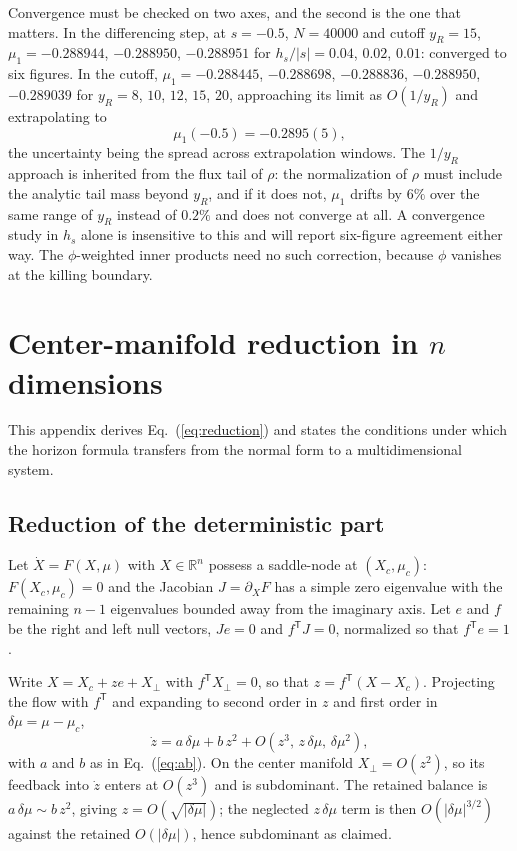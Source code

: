 Convergence must be checked on two axes, and the second is the one that matters.  In the differencing step, at $s=-0.5$, $N=40000$ and cutoff $y_R=15$, $\mu_1=-0.288944$, $-0.288950$, $-0.288951$ for $h_s/|s|=0.04$, $0.02$, $0.01$: converged to six figures.  In the cutoff, $\mu_1=-0.288445$, $-0.288698$, $-0.288836$, $-0.288950$, $-0.289039$ for $y_R=8$, $10$, $12$, $15$, $20$, approaching its limit as $O(1/y_R)$ and extrapolating to
\begin{equation}
\mu_1(-0.5)=-0.2895(5),
\end{equation}
the uncertainty being the spread across extrapolation windows.  The $1/y_R$ approach is inherited from the flux tail of $\rho$: the normalization of $\rho$ must include the analytic tail mass beyond $y_R$, and if it does not, $\mu_1$ drifts by $6\%$ over the same range of $y_R$ instead of $0.2\%$ and does not converge at all.  A convergence study in $h_s$ alone is insensitive to this and will report six-figure agreement either way.  The $\phi$-weighted inner products need no such correction, because $\phi$ vanishes at the killing boundary.

\section{\label{app:cmf}Center-manifold reduction in $n$ dimensions}

This appendix derives Eq.~(\ref{eq:reduction}) and states the conditions under which the horizon formula transfers from the normal form to a multidimensional system.

\subsection{Reduction of the deterministic part}

Let $\dot X=F(X,\mu)$ with $X\in\mathbb{R}^n$ possess a saddle-node at $(X_c,\mu_c)$: $F(X_c,\mu_c)=0$ and the Jacobian $J=\partial_XF$ has a simple zero eigenvalue with the remaining $n-1$ eigenvalues bounded away from the imaginary axis.  Let $e$ and $f$ be the right and left null vectors, $Je=0$ and $f^{\mathsf T}J=0$, normalized so that $f^{\mathsf T}e=1$.

Write $X=X_c+ze+X_\perp$ with $f^{\mathsf T}X_\perp=0$, so that $z=f^{\mathsf T}(X-X_c)$.  Projecting the flow with $f^{\mathsf T}$ and expanding to second order in $z$ and first order in $\delta\mu=\mu-\mu_c$,
\begin{equation}
\dot z=a\,\delta\mu+b\,z^2+O(z^3,\,z\,\delta\mu,\,\delta\mu^2),
\end{equation}
with $a$ and $b$ as in Eq.~(\ref{eq:ab}).  On the center manifold $X_\perp=O(z^2)$, so its feedback into $\dot z$ enters at $O(z^3)$ and is subdominant.  The retained balance is $a\,\delta\mu\sim b\,z^2$, giving $z=O(\sqrt{|\delta\mu|})$; the neglected $z\,\delta\mu$ term is then $O(|\delta\mu|^{3/2})$ against the retained $O(|\delta\mu|)$, hence subdominant as claimed.

